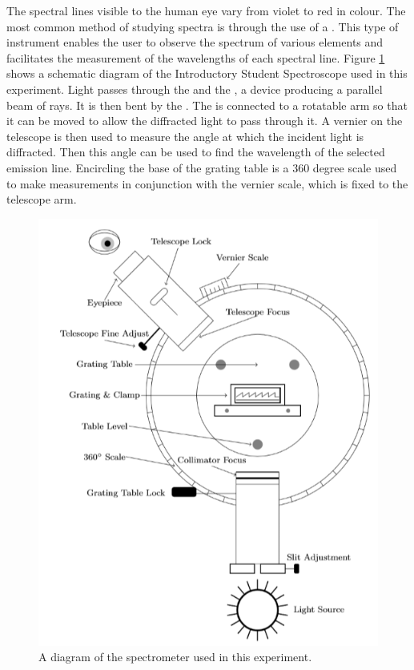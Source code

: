 \noindent The spectral lines visible to the human eye vary from violet to red in colour. The most common method of studying spectra is through the use of a . This type of instrument enables the user to observe the spectrum of various elements and facilitates the measurement of the wavelengths of each spectral line. Figure \ref{fig:SPEC2} shows a schematic diagram of the Introductory Student Spectroscope used in this experiment. Light passes through the  and the , a device producing a parallel beam of rays. It is then bent by the . The  is connected to a rotatable arm so that it can be moved to allow the diffracted light to pass through it. A vernier on the telescope is then used to measure the angle at which the incident light is diffracted. Then this angle can be used to find the wavelength of the selected emission line. Encircling the base of the grating table is a $360$ degree scale used to make measurements in conjunction with the vernier scale, which is fixed to the telescope arm.

\begin{figure}[H]
    \centering
    \includegraphics[scale = 0.8]{Images/SPEC2.PNG}
    \caption{A diagram of the spectrometer used in this experiment.}
    \label{fig:SPEC2}
\end{figure}

